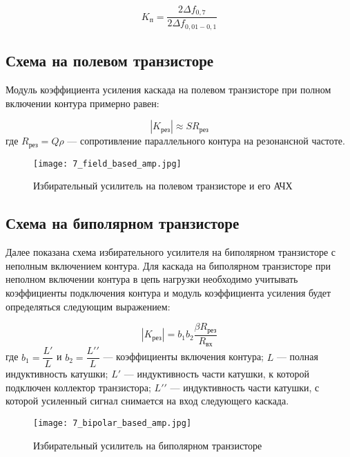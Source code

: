 \begin{equation}
K_\text{п} = \dfrac{2\Delta f_{0,7}}{2\Delta f_{0,01 - 0,1}}
\end{equation}

\subsection*{Схема на полевом транзисторе}

Модуль коэффициента усиления каскада на полевом транзисторе при полном включении контура примерно равен:

\begin{equation}
|K_\text{рез}| \approx S R_\text{рез}
\end{equation}
где $ R_\text{рез} = Q\rho $ --- сопротивление параллельного контура на резонансной частоте.

\begin{figure}[H]
\centering
\texttt{[image: 7\_field\_based\_amp.jpg]}
\caption{Избирательный усилитель на полевом транзисторе и его АЧХ}
\label{fig:7_field_based_amp}
\end{figure}

\subsection*{Схема на биполярном транзисторе}

Далее показана схема избирательного усилителя на биполярном транзисторе с неполным включением контура. Для каскада на биполярном транзисторе при неполном включении контура в цепь нагрузки необходимо учитывать коэффициенты подключения контура и модуль коэффициента усиления будет определяться следующим выражением:

\begin{equation}
|K_\text{рез}| = b_{1}b_{2} \dfrac{\beta R_\text{рез}}{R_\text{вх}}
\end{equation}
где $ b_{1} = \dfrac{L\prime}{L} $ и $ b_{2} = \dfrac{L\prime\prime}{L} $ --- коэффициенты включения контура; $L$ --- полная индуктивность катушки; $L\prime$ --- индуктивность части катушки, к которой подключен коллектор транзистора; $L\prime\prime$ --- индуктивность части катушки, с которой усиленный сигнал снимается на вход следующего каскада.

\begin{figure}[H]
\centering
\texttt{[image: 7\_bipolar\_based\_amp.jpg]}
\caption{Избирательный усилитель на биполярном транзисторе}
\label{fig:7_bipolar_based_amp}
\end{figure}

